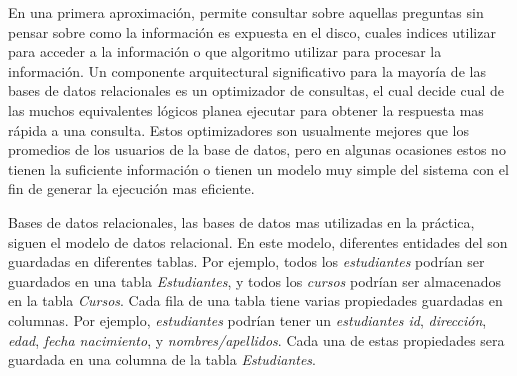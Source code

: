 En una primera aproximación, \sql permite consultar sobre aquellas preguntas sin pensar sobre como la información es expuesta en el disco, cuales indices utilizar para acceder a la información o que algoritmo utilizar para procesar la información. Un componente arquitectural significativo para la mayoría de las bases de datos relacionales es un optimizador de consultas, el cual decide cual de las muchos equivalentes lógicos planea ejecutar para obtener la respuesta mas rápida a una consulta. Estos optimizadores son usualmente mejores que los promedios de los usuarios de la base de datos, pero en algunas ocasiones estos no tienen la suficiente información o tienen un modelo muy simple del sistema con el fin de generar la ejecución mas eficiente.

Bases de datos relacionales, las bases de datos mas utilizadas en la práctica, siguen el modelo de datos relacional. En este modelo, diferentes entidades del \realWorld son guardadas en diferentes tablas. Por ejemplo, todos los \textit{estudiantes} podrían ser guardados en una tabla \textit{Estudiantes}, y todos los \textit{cursos} podrían ser almacenados en la tabla \textit{Cursos}. Cada fila de una tabla tiene varias propiedades guardadas en columnas. Por ejemplo, \textit{estudiantes} podrían tener un \textit{estudiantes id}, \textit{dirección}, \textit{edad},  \textit{fecha nacimiento}, y \textit{nombres/apellidos}. Cada una de estas propiedades sera guardada en una columna de la tabla \textit{Estudiantes}.


